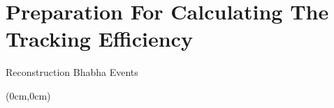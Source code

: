 \documentclass[8pt]{beamer}
\begin{document}
\section{Preparation For Calculating The Tracking Efficiency}


\begin{frame}{Reconstruction Bhabha Events}


\begin{textblock*}{11cm}(0cm,0cm)
\end{textblock*}
\end{frame}
\end{document}
